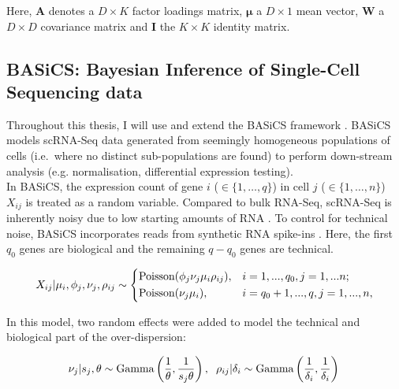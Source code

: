 Here, $\bm{A}$ denotes a $D\times{}K$ factor loadings matrix, $\bm{\mu}$ a $D\times{}1$ mean vector, $\bm{W}$ a $D\times{}D$ covariance matrix and $\bm{I}$ the $K\times{}K$ identity matrix.

\subsection{BASiCS: Bayesian Inference of Single-Cell Sequencing data} 
\label{sec0:BASiCS}

Throughout this thesis, I will use and extend the \gls{BASiCS} framework \citep{Vallejos2015BASiCS, Vallejos2016}. BASiCS models scRNA-Seq data generated from seemingly homogeneous populations of cells (i.e.~where no distinct sub-populations are found) to perform down-stream analysis (e.g. normalisation, differential expression testing).\\

In BASiCS, the expression count of gene $i$ ($ \in \{1, \ldots, q\}$) in cell $j$ ($\in \{ 1, \ldots ,n\}$) $X_{ij}$ is treated as a random variable. Compared to bulk RNA-Seq, scRNA-Seq is inherently noisy due to low starting amounts of RNA \citep{Brennecke2013}. To control for technical noise, BASiCS incorporates reads from synthetic RNA spike-ins \citep{Jiang2011}. Here, the first $q_0$ genes are biological and the  remaining $q-q_0$ genes are technical.

\begin{equation} 
 X_{ij}|\mu_i,\phi_j,\nu_j,\rho_{ij} \sim
 \left\lbrace
  \begin{aligned}
    &\textnormal{Poisson}(\phi_j\nu_j\mu_i\rho_{ij}), && i=1,...,q_0,j=1,...n;  \\ 
    &\textnormal{Poisson}(\nu_j\mu_i), && i=q_0+1,...,q,j=1,...,n,    	    
  \end{aligned}
\right.
\end{equation} 

In this model, two random effects were added to model the technical and biological part of the over-dispersion:

\begin{equation} 
\nu_j|s_j,\theta \sim \textnormal{Gamma}\left(\frac{1}{\theta},\frac{1}{s_j\theta}\right), \hspace{0.2cm} \rho_{ij}|\delta_i  \sim \textnormal{Gamma}\left(\frac{1}{\delta_i},\frac{1}{\delta_i}\right)\\
\end{equation} 

